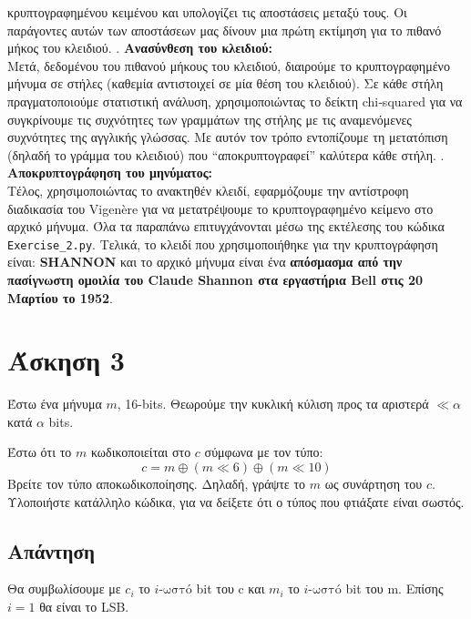 \documentclass[12pt]{article}
\begin{document}
   κρυπτογραφημένου κειμένου και υπολογίζει τις αποστάσεις μεταξύ τους. Οι παράγοντες αυτών των αποστάσεων μας δίνουν μια πρώτη εκτίμηση για το πιθανό μήκος του κλειδιού.
\newline
{}. \textbf{Ανασύνθεση του κλειδιού:}\\
   Μετά, δεδομένου του πιθανού μήκους του κλειδιού, διαιρούμε το κρυπτογραφημένο μήνυμα σε στήλες (καθεμία αντιστοιχεί σε μία θέση του κλειδιού). Σε κάθε στήλη πραγματοποιούμε στατιστική ανάλυση, χρησιμοποιώντας το δείκτη chi‑squared για να συγκρίνουμε τις συχνότητες των γραμμάτων της στήλης με τις αναμενόμενες συχνότητες της αγγλικής γλώσσας. Με αυτόν τον τρόπο εντοπίζουμε τη μετατόπιση (δηλαδή το γράμμα του κλειδιού) που “αποκρυπτογραφεί” καλύτερα κάθε στήλη.
\newline
{}. \textbf{Αποκρυπτογράφηση του μηνύματος:}\\
   Τέλος, χρησιμοποιώντας το ανακτηθέν κλειδί, εφαρμόζουμε την αντίστροφη διαδικασία του Vigen\`ere για να μετατρέψουμε το κρυπτογραφημένο κείμενο στο αρχικό μήνυμα.
\newline
\newline
Όλα τα παραπάνω επιτυγχάνονται μέσω της εκτέλεσης του κώδικα \texttt{Exercise\_2.py}.
\newline
\newline
Τελικά, το κλειδί που χρησιμοποιήθηκε για την κρυπτογράφηση είναι: \textbf{SHANNON} και το αρχικό μήνυμα είναι ένα \textbf{απόσμασμα από την πασίγνωστη ομοιλία του Claude Shannon στα εργαστήρια Bell στις 20 Μαρτίου το 1952}.
\hfill \blacksquare

\section*{Άσκηση 3}
Έστω ένα μήνυμα \( m \), 16-bits. Θεωρούμε την κυκλική κύλιση προς τα αριστερά \( \ll {\alpha} \)
κατά \( \alpha \) bits.

Έστω ότι το \( m \) κωδικοποιείται στο \( c \) σύμφωνα με τον τύπο:
\[
c = m \oplus (m \ll 6) \oplus (m \ll 10)
\]
Βρείτε τον τύπο αποκωδικοποίησης. Δηλαδή, γράψτε το \( m \) ως συνάρτηση του \( c \). Υλοποιήστε κατάλληλο κώδικα, για να δείξετε ότι ο τύπος που φτιάξατε είναι σωστός.


\subsection*{Απάντηση}
Θα συμβωλίσουμε με \( c_i\) το \( i  \text{-ωστό} \) bit του c και \( m_i \) το \( i  \text{-ωστό} \) bit του m. Επίσης \( i = 1 \) θα είναι το LSB.  
\end{document}
